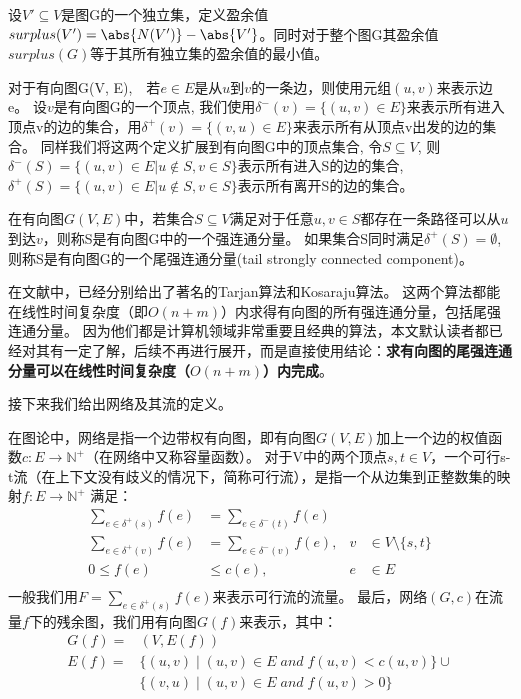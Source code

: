 设$V' \subseteq V$是图G的一个独立集，定义盈余值$surplus(V') = \abs{N(V')} - \abs{V'}$。同时对于整个图G其盈余值$surplus(G)$等于其所有独立集的盈余值的最小值。

对于有向图G(V, E),　若$e \in E$是从$u$到$v$的一条边，则使用元组$(u, v)$来表示边e。
设$v$是有向图G的一个顶点, 我们使用$\delta^-(v)=\{(u, v) \in E\}$来表示所有进入顶点v的边的集合，用$\delta^+(v)=\{(v, u) \in E\}$来表示所有从顶点v出发的边的集合。
同样我们将这两个定义扩展到有向图G中的顶点集合, 令$S \subseteq V$, 则$\delta^-(S)=\{(u, v) \in E | u \notin S, v \in S\}$表示所有进入S的边的集合,
$\delta^+(S)=\{(u, v) \in E | u \notin S, v \in S\}$表示所有离开S的边的集合。

\begin{definition}
在有向图$G(V, E)$中，若集合$S \subseteq V$满足对于任意$u, v \in S$都存在一条路径可以从$u$到达$v$，则称S是有向图G中的一个强连通分量。
如果集合S同时满足$\delta^+(S) = \emptyset$, 则称S是有向图G的一个尾强连通分量(tail strongly connected component)。
\end{definition}

在文献\cite{tarjan1972depth,sharir1981strong}中，已经分别给出了著名的Tarjan算法和Kosaraju算法。
这两个算法都能在线性时间复杂度（即$O(n + m)$）内求得有向图的所有强连通分量，包括尾强连通分量。
因为他们都是计算机领域非常重要且经典的算法，本文默认读者都已经对其有一定了解，后续不再进行展开，而是直接使用结论：\textbf{求有向图的尾强连通分量可以在线性时间复杂度（$O(n + m)$）内完成}。

接下来我们给出网络及其流的定义。

在图论中，网络是指一个边带权有向图，即有向图$G(V, E)$加上一个边的权值函数$c: E \rightarrow \mathbb{N}^+$（在网络中又称容量函数）。
对于V中的两个顶点$s, t \in V$，一个可行s-t流（在上下文没有歧义的情况下，简称可行流），是指一个从边集到正整数集的映射$f: E \rightarrow \mathbb{N}^+$ 满足：
\begin{equation} \label{EquationFlow} \begin{aligned}
  \sum_{e\in \delta^+(s)}{f(e)}&=\sum_{e\in \delta^-(t)}{f(e)}& \\
  \sum_{e\in \delta^+(v)}{f(e)}&=\sum_{e\in \delta^-(v)}{f(e)}, & v &\in V \setminus \{s, t\} \\
  0 \le f(e) &\le c(e), & e &\in E \\
\end{aligned} \end{equation}
一般我们用$F=\sum_{e\in \delta^+(s)}{f(e)}$来表示可行流的流量。
最后，网络$(G, c)$在流量$f$下的残余图，我们用有向图$G(f)$来表示，其中：
\begin{equation*} \begin{aligned}
  G(f) = &(V, E(f)) \\
  E(f) = &\{(u,v)\;|\;(u, v) \in E\;and\;f(u, v) < c(u, v)\} \cup \\
  &\{(v,u)\;|\;(u, v) \in E\;and\;f(u, v) > 0\}
\end{aligned} \end{equation*}


